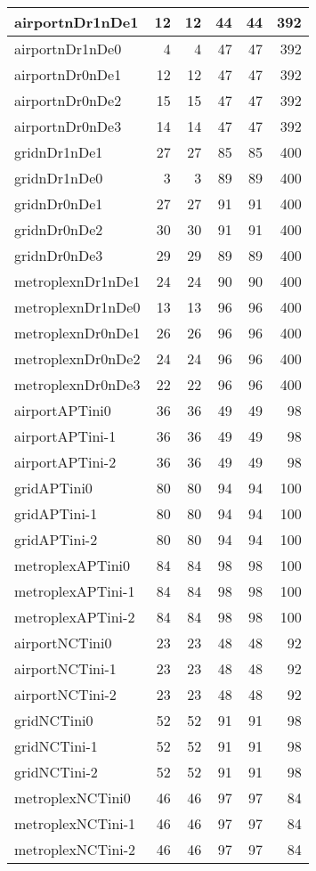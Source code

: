\begin{longtable}{|l|r|r|r|r|r|}
\endlastfoot
airportnDr1nDe1 & 12 & 12 & 44 & 44 & 392 \\ \hline
airportnDr1nDe0 & 4 & 4 & 47 & 47 & 392 \\ \hline
airportnDr0nDe1 & 12 & 12 & 47 & 47 & 392 \\ \hline
airportnDr0nDe2 & 15 & 15 & 47 & 47 & 392 \\ \hline
airportnDr0nDe3 & 14 & 14 & 47 & 47 & 392 \\ \hline
gridnDr1nDe1 & 27 & 27 & 85 & 85 & 400 \\ \hline
gridnDr1nDe0 & 3 & 3 & 89 & 89 & 400 \\ \hline
gridnDr0nDe1 & 27 & 27 & 91 & 91 & 400 \\ \hline
gridnDr0nDe2 & 30 & 30 & 91 & 91 & 400 \\ \hline
gridnDr0nDe3 & 29 & 29 & 89 & 89 & 400 \\ \hline
metroplexnDr1nDe1 & 24 & 24 & 90 & 90 & 400 \\ \hline
metroplexnDr1nDe0 & 13 & 13 & 96 & 96 & 400 \\ \hline
metroplexnDr0nDe1 & 26 & 26 & 96 & 96 & 400 \\ \hline
metroplexnDr0nDe2 & 24 & 24 & 96 & 96 & 400 \\ \hline
metroplexnDr0nDe3 & 22 & 22 & 96 & 96 & 400 \\ \hline
airportAPTini0 & 36 & 36 & 49 & 49 & 98 \\ \hline
airportAPTini-1 & 36 & 36 & 49 & 49 & 98 \\ \hline
airportAPTini-2 & 36 & 36 & 49 & 49 & 98 \\ \hline
gridAPTini0 & 80 & 80 & 94 & 94 & 100 \\ \hline
gridAPTini-1 & 80 & 80 & 94 & 94 & 100 \\ \hline
gridAPTini-2 & 80 & 80 & 94 & 94 & 100 \\ \hline
metroplexAPTini0 & 84 & 84 & 98 & 98 & 100 \\ \hline
metroplexAPTini-1 & 84 & 84 & 98 & 98 & 100 \\ \hline
metroplexAPTini-2 & 84 & 84 & 98 & 98 & 100 \\ \hline
airportNCTini0 & 23 & 23 & 48 & 48 & 92 \\ \hline
airportNCTini-1 & 23 & 23 & 48 & 48 & 92 \\ \hline
airportNCTini-2 & 23 & 23 & 48 & 48 & 92 \\ \hline
gridNCTini0 & 52 & 52 & 91 & 91 & 98 \\ \hline
gridNCTini-1 & 52 & 52 & 91 & 91 & 98 \\ \hline
gridNCTini-2 & 52 & 52 & 91 & 91 & 98 \\ \hline
metroplexNCTini0 & 46 & 46 & 97 & 97 & 84 \\ \hline
metroplexNCTini-1 & 46 & 46 & 97 & 97 & 84 \\ \hline
metroplexNCTini-2 & 46 & 46 & 97 & 97 & 84 \\ \hline
\end{longtable}
